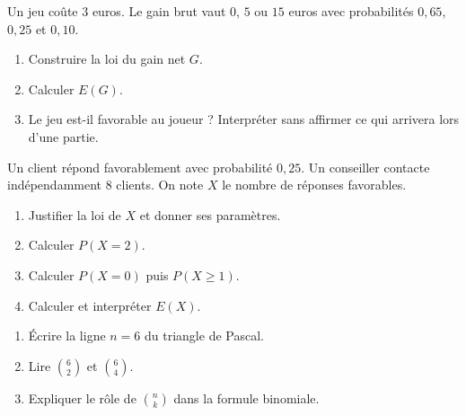 \begin{exercice}
Un jeu coûte $3$ euros. Le gain brut vaut $0$, $5$ ou $15$ euros avec probabilités $0{,}65$, $0{,}25$ et $0{,}10$.
\begin{enumerate}
\item Construire la loi du gain net $G$.
\item Calculer $E(G)$.
\item Le jeu est-il favorable au joueur ? Interpréter sans affirmer ce qui arrivera lors d'une partie.
\end{enumerate}
\end{exercice}
\begin{exercice}
Un client répond favorablement avec probabilité $0{,}25$. Un conseiller contacte indépendamment $8$ clients. On note $X$ le nombre de réponses favorables.
\begin{enumerate}
\item Justifier la loi de $X$ et donner ses paramètres.
\item Calculer $P(X=2)$.
\item Calculer $P(X=0)$ puis $P(X\geq1)$.
\item Calculer et interpréter $E(X)$.
\end{enumerate}
\end{exercice}
\begin{exercice}
\begin{enumerate}
\item Écrire la ligne $n=6$ du triangle de Pascal.
\item Lire $\binom62$ et $\binom64$.
\item Expliquer le rôle de $\binom nk$ dans la formule binomiale.
\end{enumerate}
\end{exercice}
